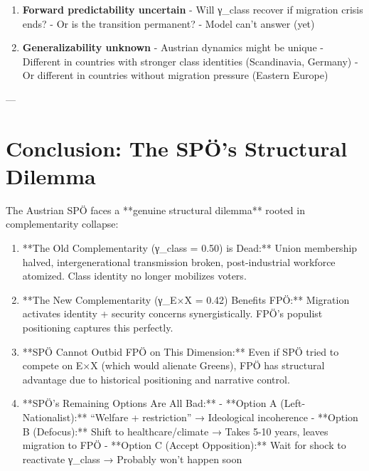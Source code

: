 {{{{{{{{\begin{tcolorbox}[colback=red!5!white, colframe=red!75!black,
    title=Limitations]
\begin{enumerate}
\item \textbf{Forward predictability uncertain}
   - Will γ_class recover if migration crisis ends?
   - Or is the transition permanent?
   - Model can't answer (yet)

\item \textbf{Generalizability unknown}
   - Austrian dynamics might be unique
   - Different in countries with stronger class identities (Scandinavia, Germany)
   - Or different in countries without migration pressure (Eastern Europe)

\end{enumerate}

\end{tcolorbox}

---

\section{Conclusion: The SPÖ's Structural Dilemma}

The Austrian SPÖ faces a **genuine structural dilemma** rooted in complementarity collapse:

\begin{enumerate}

\item **The Old Complementarity (γ_class = 0.50) is Dead:** Union membership halved, intergenerational transmission broken, post-industrial workforce atomized. Class identity no longer mobilizes voters.

\item **The New Complementarity (γ_{E×X} = 0.42) Benefits FPÖ:** Migration activates identity + security concerns synergistically. FPÖ's populist positioning captures this perfectly.

\item **SPÖ Cannot Outbid FPÖ on This Dimension:** Even if SPÖ tried to compete on E×X (which would alienate Greens), FPÖ has structural advantage due to historical positioning and narrative control.

\item **SPÖ's Remaining Options Are All Bad:**
   - **Option A (Left-Nationalist):** ``Welfare + restriction'' → Ideological incoherence
   - **Option B (Defocus):** Shift to healthcare/climate → Takes 5-10 years, leaves migration to FPÖ
   - **Option C (Accept Opposition):** Wait for shock to reactivate γ_class → Probably won't happen soon

\end{enumerate}

}}}}}}}}
